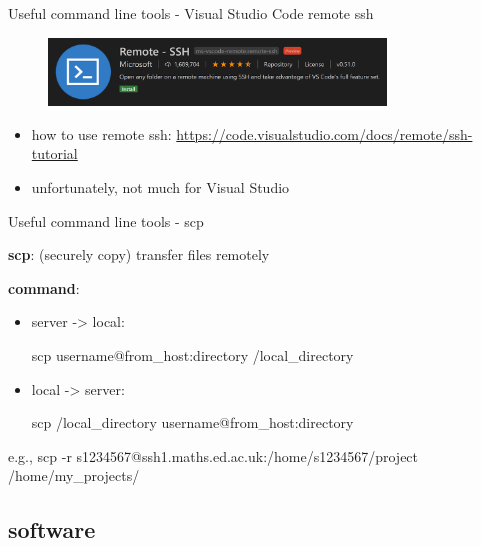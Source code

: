 \documentclass[10pt]{beamer}
\begin{document}
\begin{frame}[fragile]{Useful command line tools - Visual Studio Code remote ssh}

\begin{figure}[!ht]
\centering
\includegraphics[width = 0.8\textwidth]{images/vs_code_remote.png}
\end{figure}

\begin{itemize}
    \item how to use remote ssh: \underline{https://code.visualstudio.com/docs/remote/ssh-tutorial}
    \item unfortunately, not much for Visual Studio
\end{itemize}

\end{frame}

\begin{frame}[fragile]{Useful command line tools - scp}

\textbf{scp}: (securely copy) transfer files remotely

\hfill

\textbf{command}: 
\begin{itemize}
    \item {server -> local: 
    
    scp username@from\_host:directory /local\_directory}
    \item {local -> server: 
    
    scp /local\_directory username@from\_host:directory}
\end{itemize}

\quad e.g., scp -r s1234567@ssh1.maths.ed.ac.uk:/home/s1234567/project /home/my\_projects/

\end{frame}

\subsection{software}
\end{document}
